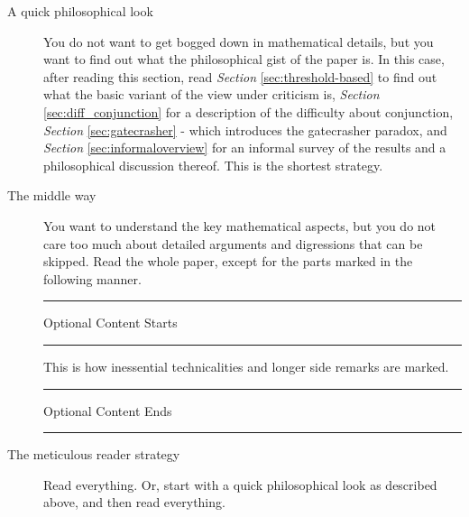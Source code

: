 \documentclass{ifcolog}
\newcommand{\intermezzoa}{
	\begin{minipage}[c]{13cm}
	\begin{center}\rule{10cm}{0.4pt}



	\tiny{\sc Optional Content Starts}
	
	\vspace{-1mm}
	
	\rule{10cm}{0.4pt}\end{center}
	\end{minipage}\nopagebreak 
	}
\newcommand{\intermezzob}{\nopagebreak 
	\begin{minipage}[c]{13cm}
	\begin{center}\rule{10cm}{0.4pt}

	\tiny{\sc Optional Content Ends}
	
	\vspace{-1mm}
	
	\rule{10cm}{0.4pt}\end{center}
	\end{minipage}
	}
\begin{document}
\begin{description}
	\item[A quick philosophical look] You do not want to get bogged down in mathematical details, but you want to find out what the philosophical gist of the paper is. In this case, after reading this section, read \emph{Section} \ref{sec:threshold-based} to find out what the basic variant of the view under criticism is, \emph{Section} \ref{sec:diff_conjunction} for a description of the difficulty about conjunction, \emph{Section} \ref{sec:gatecrasher} - which introduces the gatecrasher paradox, and \emph{Section} \ref{sec:informaloverview} for an informal survey of the results and a philosophical discussion thereof. This is the shortest strategy.

	\item[The middle way] You want to understand the key mathematical aspects, but you do not care too much about detailed arguments and digressions that can be skipped. Read the whole paper, except for the parts marked in the following manner.


 \intermezzoa

 This is how inessential technicalities and longer side remarks are marked. 

 \intermezzob 


\item[The meticulous reader strategy] Read everything. Or, start with a quick philosophical look as described above, and then read everything. 



\end{description}
\end{document}
